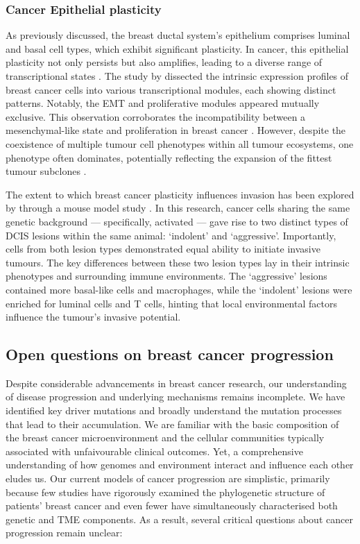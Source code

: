 \subsubsection*{Cancer Epithelial plasticity}

As previously discussed, the breast ductal system's epithelium comprises luminal and basal cell types, which exhibit significant plasticity. In cancer, this epithelial plasticity not only persists but also amplifies, leading to a diverse range of transcriptional states \parencite{Wagner2019-zp, Wu2021-uq, Pal2021-rf}. The study by \textcite{Wu2021-uq} dissected the intrinsic expression profiles of breast cancer cells into various transcriptional modules, each showing distinct patterns. Notably, the \acf{EMT} and proliferative modules appeared mutually exclusive. This observation corroborates the incompatibility between a mesenchymal-like state and proliferation in breast cancer \parencite{Tsai2012-hb}. However, despite the coexistence of multiple tumour cell phenotypes within all tumour ecosystems, one phenotype often dominates, potentially reflecting the expansion of the fittest tumour subclones \parencite{Wagner2019-zp}.

The extent to which breast cancer plasticity influences invasion has been explored by \textcite{Sinha2021-mf} through a mouse model study . In this research, cancer cells sharing the same genetic background — specifically, activated  — gave rise to two distinct types of \ac{DCIS} lesions within the same animal: `indolent' and `aggressive'. Importantly, cells from both lesion types demonstrated equal ability to initiate invasive tumours. The key differences between these two lesion types lay in their intrinsic phenotypes and surrounding immune environments. The `aggressive' lesions contained more basal-like cells and macrophages, while the `indolent' lesions were enriched for luminal cells and T cells, hinting that local environmental factors influence the tumour's invasive potential.

\subsection{Open questions on breast cancer progression}
\label{sec:application-open-questions}
Despite considerable advancements in breast cancer research, our understanding of disease progression and underlying mechanisms remains incomplete. We have identified key driver mutations and broadly understand the mutation processes that lead to their accumulation. We are familiar with the basic composition of the breast cancer microenvironment and the cellular communities typically associated with unfaivourable clinical outcomes. Yet, a comprehensive understanding of how genomes and environment interact and influence each other eludes us. Our current models of cancer progression are simplistic, primarily because few studies have rigorously examined the phylogenetic structure of patients' breast cancer and even fewer have simultaneously characterised both genetic and \ac{TME} components. As a result, several critical questions about cancer progression remain unclear:


